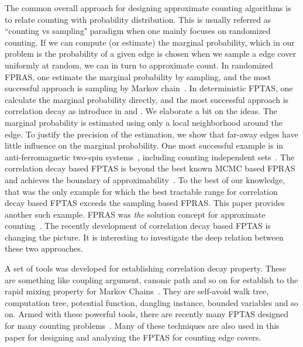 The common overall approach for designing approximate counting algorithms is to relate counting with probability distribution.
 This is usually referred as ``counting vs sampling" paradigm when one mainly focuses on randomized counting.  If we can compute (or estimate) the marginal probability, which in our problem is the probability of a given edge is chosen when we sample a edge cover uniformly at random, we can in turn to approximate count. In randomized FPRAS, one estimate the marginal probability by sampling, and the most successful approach is sampling by Markov chain~\cite{MC_JA96}.
In deterministic FPTAS, one calculate the marginal probability directly, and the most successful approach is correlation decay as introduce in \cite{BG08} and \cite{Weitz06}. We elaborate a bit on the ideas.
 The marginal probability is estimated using only a local neighborhood around the edge. To justify the precision of the estimation, we show that far-away edges have little influence on the marginal probability.
One most successful example is in anti-ferromagnetic two-spin systems~\cite{LLY12,SST,LLY13}, including counting independent sets~\cite{Weitz06}. The correlation decay based FPTAS is beyond the best known MCMC based FPRAS and achieves the boundary of approximability~\cite{SS12,galanis2012inapproximability}.
To the best of our knowledge, that was the only example for which the best tractable range for correlation decay based FPTAS exceeds the sampling based FPRAS. This paper provides another such example. FPRAS was \emph{the} solution concept for approximate counting~\cite{dich_DGGJ00}. The recently development of correlation decay based FPTAS is changing the picture. It is interesting to investigate the deep relation between these two approaches.

A set of tools was developed for establishing correlation decay property. These are something like coupling argument, canonic path and so on for establish to the rapid mixing property for Markov Chains~\cite{MC_JA96}.
They are self-avoid walk tree, computation tree, potential function, dangling instance, bounded variables and so on. Armed with these powerful tools, there are recently many FPTAS designed for many counting problems~\cite{LLY12,SST,LLY13,YZ13,fibo-approx}.
Many of these techniques are also used in this paper for designing and analyzing the FPTAS for counting edge covers.

